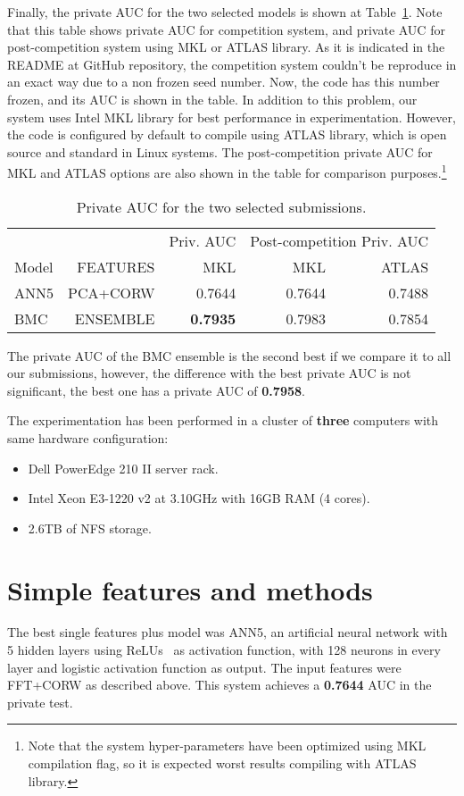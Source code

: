 \documentclass[a4paper,english,twoside]{article}
\begin{document}
Finally, the private AUC for the two selected models is shown at
Table~\ref{tab:private}. Note that this table shows private AUC for competition
system, and private AUC for post-competition system using MKL or ATLAS
library. As it is indicated in the README at GitHub repository, the competition
system couldn't be reproduce in an exact way due to a non frozen seed number.
Now, the code has this number frozen, and its AUC is shown in the table. In
addition to this problem, our system uses Intel MKL library for best performance
in experimentation. However, the code is configured by default to compile using
ATLAS library, which is open source and standard in Linux systems. The
post-competition private AUC for MKL and ATLAS options are also shown in the
table for comparison purposes.\footnote{Note that the system hyper-parameters
  have been optimized using MKL compilation flag, so it is expected worst
  results compiling with ATLAS library.}

\begin{table}
  \centering
  \begin{tabular}{|l|r|r||r|r|}
    \hline
          &          & Priv. AUC & \multicolumn{2}{|c|}{Post-competition Priv. AUC}\\
    Model & FEATURES & MKL & MKL & ATLAS \\
    \hline
    \hline
    ANN5 & PCA+CORW & 0.7644          & 0.7644 & 0.7488\\
    BMC & ENSEMBLE & \textbf{0.7935}  & 0.7983 & 0.7854\\
    \hline
  \end{tabular}
  \caption{Private AUC for the two selected submissions.\label{tab:private}}
\end{table}

The private AUC of the BMC ensemble is the second best if we compare it
to all our submissions, however, the difference with the best private
AUC is not significant, the best one has a private AUC of
\textbf{0.7958}.

The experimentation has been performed in a cluster of \textbf{three}
computers with same hardware configuration:

\begin{itemize}
\item
  Dell PowerEdge 210 II server rack.
\item
  Intel Xeon E3-1220 v2 at 3.10GHz with 16GB RAM (4 cores).
\item
  2.6TB of NFS storage.
\end{itemize}

\section{Simple features and methods}\label{simple-features-and-methods}

The best single features plus model was ANN5, an artificial neural
network with 5 hidden layers using ReLUs~\cite{2011:glorot:aistats}
as activation function, with 128 neurons in every layer and logistic
activation function as output. The input features were FFT+CORW as
described above. This system achieves a \textbf{0.7644} AUC in the
private test.



\end{document}
